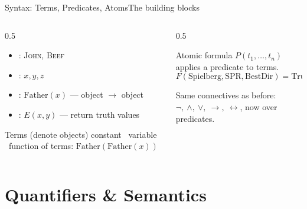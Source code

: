 \documentclass[aspectratio=169,11pt]{beamer}
\begin{document}
\begin{frame}{Syntax: Terms, Predicates, Atoms}{The building blocks}
  \begin{columns}[T]
    \begin{column}{0.5\textwidth}
      \small
      \begin{itemize}
        \item {}: \textsc{John}, \textsc{Beef}
        \item {}: $x, y, z$
        \item {}: $\mathrm{Father}(x)$ — object $\to$ object
        \item {}: $E(x,y)$ — return truth values
      \end{itemize}
      \vspace{0.3em}
      \begin{block}{Terms (denote objects)}
        \scriptsize
        constant \textbullet\ variable \textbullet\ function of terms:
        $\mathrm{Father}(\mathrm{Father}(x))$
      \end{block}
    \end{column}
    \begin{column}{0.5\textwidth}
      \begin{exampleblock}{Atomic formula}
        \small $P(t_1,\dots,t_n)$ applies a predicate to terms.
        \[ F(\text{Spielberg}, \text{SPR}, \text{BestDir}) = \text{True} \]
      \end{exampleblock}
      \centering\scriptsize
      Same connectives as before: $\neg,\ \land,\ \lor,\ \rightarrow,\ \leftrightarrow$,
      now over predicates.
    \end{column}
  \end{columns}
\end{frame}

\section{Quantifiers \& Semantics}
\end{document}

